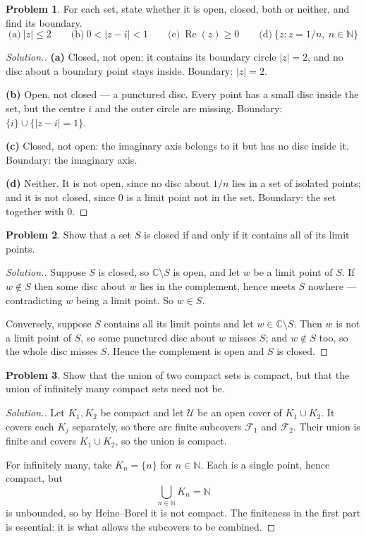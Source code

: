 \documentclass[11pt,a4paper]{article}
\theoremstyle{definition}
\newtheorem{problemx}{Problem}[section]
\newenvironment{problem}{\begin{problemx}}{\end{problemx}}
\newenvironment{solution}
  {\renewcommand{\qedsymbol}{}\begin{proof}[\textit{Solution}.]}
  {\end{proof}}
\begin{document}
\begin{problem}
For each set, state whether it is open, closed, both or neither, and find its
boundary.
$$\text{(a)}\ \left|z\right|\leq 2\qquad
\text{(b)}\ 0<\left|z-i\right|<1\qquad
\text{(c)}\ \operatorname{Re}(z)\geq 0\qquad
\text{(d)}\ \{z: z=1/n,\ n\in\mathbb{N}\}$$
\end{problem}
\begin{solution}
\textbf{(a)} Closed, not open: it contains its boundary circle
$\left|z\right|=2$, and no disc about a boundary point stays inside. Boundary:
$\left|z\right|=2$.

\textbf{(b)} Open, not closed --- a punctured disc. Every point has a small disc
inside the set, but the centre $i$ and the outer circle are missing. Boundary:
$\{i\}\cup\{\left|z-i\right|=1\}$.

\textbf{(c)} Closed, not open: the imaginary axis belongs to it but has no disc
inside it. Boundary: the imaginary axis.

\textbf{(d)} Neither. It is not open, since no disc about $1/n$ lies in a set of
isolated points; and it is not closed, since $0$ is a limit point not in the
set. Boundary: the set together with $0$.
\end{solution}

\begin{problem}
Show that a set $S$ is closed if and only if it contains all of its limit
points.
\end{problem}
\begin{solution}
Suppose $S$ is closed, so $\mathbb{C}\setminus S$ is open, and let $w$ be a
limit point of $S$. If $w\notin S$ then some disc about $w$ lies in the
complement, hence meets $S$ nowhere --- contradicting $w$ being a limit point.
So $w\in S$.

Conversely, suppose $S$ contains all its limit points and let
$w\in\mathbb{C}\setminus S$. Then $w$ is not a limit point of $S$, so some
punctured disc about $w$ misses $S$; and $w\notin S$ too, so the whole disc
misses $S$. Hence the complement is open and $S$ is closed.
\end{solution}

\begin{problem}
Show that the union of two compact sets is compact, but that the union of
infinitely many compact sets need not be.
\end{problem}
\begin{solution}
Let $K_1,K_2$ be compact and let $\mathcal{U}$ be an open cover of
$K_1\cup K_2$. It covers each $K_j$ separately, so there are finite subcovers
$\mathcal{F}_1$ and $\mathcal{F}_2$. Their union is finite and covers
$K_1\cup K_2$, so the union is compact.

For infinitely many, take $K_n=\{n\}$ for $n\in\mathbb{N}$. Each is a single
point, hence compact, but
$$\bigcup_{n\in\mathbb{N}}K_n=\mathbb{N}$$
is unbounded, so by Heine--Borel it is not compact. The finiteness in the first
part is essential: it is what allows the subcovers to be combined.
\end{solution}
\end{document}
